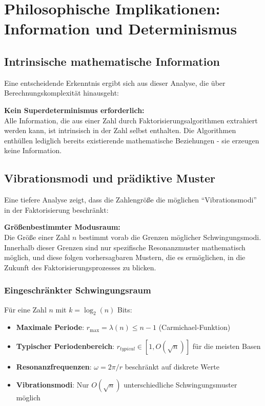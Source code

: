 	\section{Philosophische Implikationen: Information und Determinismus}
	
	\subsection{Intrinsische mathematische Information}
	
	Eine entscheidende Erkenntnis ergibt sich aus dieser Analyse, die über Berechnungskomplexität hinausgeht:
	
	\begin{tcolorbox}[colback=blue!10,colframe=blue!50,title=Fundamentales Prinzip]
		\textbf{Kein Superdeterminismus erforderlich:} \\
		Alle Information, die aus einer Zahl durch Faktorisierungsalgorithmen extrahiert werden kann, ist intrinsisch in der Zahl selbst enthalten. Die Algorithmen enthüllen lediglich bereits existierende mathematische Beziehungen - sie erzeugen keine Information.
	\end{tcolorbox}
	
	\subsection{Vibrationsmodi und prädiktive Muster}
	
	Eine tiefere Analyse zeigt, dass die Zahlengröße die möglichen ``Vibrationsmodi'' in der Faktorisierung beschränkt:
	
	\begin{tcolorbox}[colback=purple!10,colframe=purple!50,title=Vibrationseinschränkungsprinzip]
		\textbf{Größenbestimmter Modusraum:} \\
		Die Größe einer Zahl $n$ bestimmt vorab die Grenzen möglicher Schwingungsmodi. Innerhalb dieser Grenzen sind nur spezifische Resonanzmuster mathematisch möglich, und diese folgen vorhersagbaren Mustern, die es ermöglichen, in die Zukunft des Faktorisierungsprozesses zu blicken.
	\end{tcolorbox}
	
	\subsubsection{Eingeschränkter Schwingungsraum}
	
	Für eine Zahl $n$ mit $k = \log_2(n)$ Bits:
	
	\begin{itemize}
		\item \textbf{Maximale Periode}: $r_{\max} = \lambda(n) \leq n-1$ (Carmichael-Funktion)
		\item \textbf{Typischer Periodenbereich}: $r_{typical} \in [1, O(\sqrt{n})]$ für die meisten Basen
		\item \textbf{Resonanzfrequenzen}: $\omega = 2\pi/r$ beschränkt auf diskrete Werte
		\item \textbf{Vibrationsmodi}: Nur $O(\sqrt{n})$ unterschiedliche Schwingungsmuster möglich
	\end{itemize}
	

